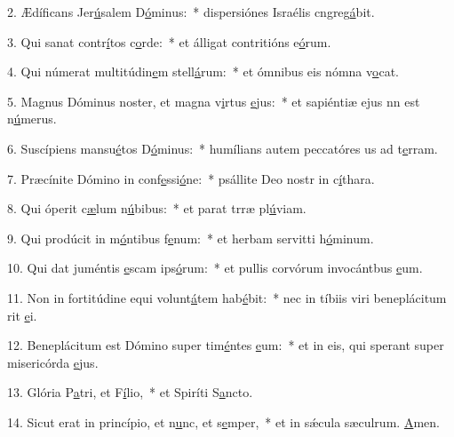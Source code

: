 2. Ædíficans Jer\uline{ú}salem D\uline{ó}minus:~* dispersiónes Israélis cngreg\uline{á}bit.\par 
3. Qui sanat contr\uline{í}tos c\uline{o}rde:~* et álligat contritións e\uline{ó}rum.\par 
4. Qui númerat multitúdin\uline{e}m stell\uline{á}rum:~* et ómnibus eis nómna v\uline{o}cat.\par 
5. Magnus Dóminus noster, et magna v\uline{i}rtus \uline{e}jus:~* et sapiéntiæ ejus nn est n\uline{ú}merus.\par 
6. Suscípiens mansu\uline{é}tos D\uline{ó}minus:~* humílians autem peccatóres us ad t\uline{e}rram.\par 
7. Præcínite Dómino in conf\uline{e}ssi\uline{ó}ne:~* psállite Deo nostr in c\uline{í}thara.\par 
8. Qui óperit c\uline{æ}lum n\uline{ú}bibus:~* et parat trræ pl\uline{ú}viam.\par 
9. Qui prodúcit in m\uline{ó}ntibus f\uline{e}num:~* et herbam servitti h\uline{ó}minum.\par 
10. Qui dat juméntis \uline{e}scam ips\uline{ó}rum:~* et pullis corvórum invocántbus \uline{e}um.\par 
11. Non in fortitúdine equi volunt\uline{á}tem hab\uline{é}bit:~* nec in tíbiis viri beneplácitum rit \uline{e}i.\par 
12. Beneplácitum est Dómino super tim\uline{é}ntes \uline{e}um:~* et in eis, qui sperant super misericórda \uline{e}jus.\par 
13. Glória P\uline{a}tri, et F\uline{í}lio,~* et Spiríti S\uline{a}ncto.\par 
14. Sicut erat in princípio, et n\uline{u}nc, et s\uline{e}mper,~* et in sǽcula sæculrum. \uline{A}men.\par 
